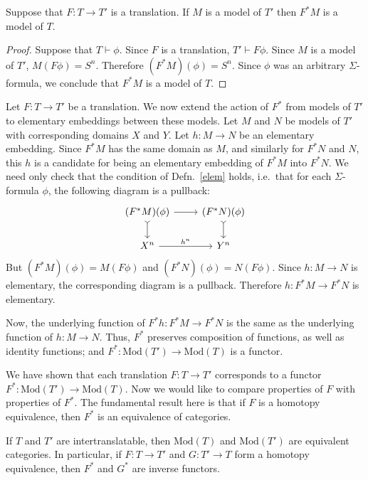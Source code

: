 \begin{prop} Suppose that $F:T\to T'$ is a translation.  If $M$ is a
model of $T'$ then $F^*M$ is a model of $T$. \end{prop}

\begin{proof} Suppose that $T\vdash \phi$.  Since $F$ is a
translation, $T'\vdash F\phi$.  Since $M$ is a model of $T'$,
$M(F\phi )=S^n$.  Therefore $(F^*M)(\phi )=S^n$.  Since $\phi$ was
an arbitrary $\Sigma$-formula, we conclude that $F^*M$ is a model
of $T$.  \end{proof}


\begin{defn} \label{mfunc} Let $F:T\to T'$ be a translation.  We now
  extend the action of $F^*$ from models of $T'$ to elementary
  embeddings between these models.  Let $M$ and $N$ be models of $T'$
  with corresponding domains $X$ and $Y$.  Let $h:M\to N$ be an
  elementary embedding.  Since $F^*M$ has the same domain as $M$, and
  similarly for $F^*N$ and $N$, this $h$ is a candidate for being an
  elementary embedding of $F^*M$ into $F^*N$.  We need only check that
  the condition of Defn.\ \ref{elem} holds, i.e.\ that for each
  $\Sigma$-formula $\phi$, the following diagram is a pullback:
  \[ \begin{tikzcd} (F^*M)(\phi ) \arrow{r}{} \arrow[>->]{d}{} &
      (F^*N)(\phi ) \arrow[>->]{d}{}
      \\
      X^n \arrow{r}{h^n} & Y^n \end{tikzcd} \] But
  $(F^*M)(\phi )=M(F\phi )$ and $(F^*N)(\phi )=N(F\phi )$.  Since
  $h:M\to N$ is elementary, the corresponding diagram is a pullback.
  Therefore $h:F^*M\to F^*N$ is elementary.

  Now, the underlying function of $F^*h:F^*M\to F^*N$ is the same as
  the underlying function of $h:M\to N$.  Thus, $F^*$ preserves
  composition of functions, as well as identity functions; and
  $F^*:\mathrm{Mod}(T')\to \mathrm{Mod}(T)$ is a functor. \end{defn}

We have shown that each translation $F:T\to T'$ corresponds to a
functor $F^*:\mathrm{Mod}(T')\to \mathrm{Mod}(T)$.  Now we would like
to compare properties of $F$ with properties of $F^*$.  The
fundamental result here is that if $F$ is a homotopy equivalence, then
$F^*$ is an equivalence of categories.  

\begin{prop} If $T$ and $T'$ are intertranslatable, then
  $\mathrm{Mod}(T)$ and $\mathrm{Mod}(T')$ are equivalent categories.
  In particular, if $F:T\to T'$ and $G:T'\to T$ form a homotopy
  equivalence, then $F^*$ and $G^*$ are inverse functors. \end{prop}

